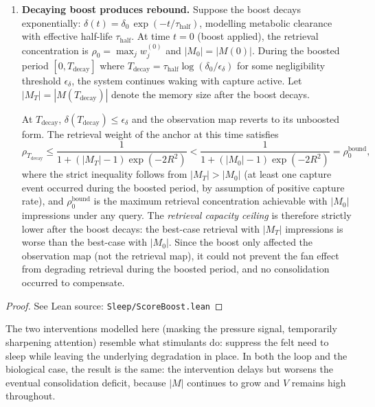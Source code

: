 \begin{theorem}
\begin{enumerate}
\item \textbf{Decaying boost produces rebound.}  Suppose the boost decays exponentially: $\delta(t) = \delta_0\,\exp(-t/\tau_{\mathrm{half}})$, modelling metabolic clearance with effective half-life $\tau_{\mathrm{half}}$.  At time $t = 0$ (boost applied), the retrieval concentration is $\rho_0 = \max_j w_j^{(0)}$ and $|M_0| = |M(0)|$.  During the boosted period $[0, T_{\mathrm{decay}}]$ where $T_{\mathrm{decay}} = \tau_{\mathrm{half}}\log(\delta_0/\epsilon_\delta)$ for some negligibility threshold $\epsilon_\delta$, the system continues waking with capture active.  Let $|M_{T}| = |M(T_{\mathrm{decay}})|$ denote the memory size after the boost decays.

At $T_{\mathrm{decay}}$, $\delta(T_{\mathrm{decay}}) \leq \epsilon_\delta$ and the observation map reverts to its unboosted form.  The retrieval weight of the anchor at this time satisfies
\[
\rho_{T_{\mathrm{decay}}} \leq \frac{1}{1 + (|M_{T}| - 1)\exp(-2R^2)} < \frac{1}{1 + (|M_0| - 1)\exp(-2R^2)} = \rho_0^{\mathrm{bound}},
\]
where the strict inequality follows from $|M_T| > |M_0|$ (at least one capture event occurred during the boosted period, by assumption of positive capture rate), and $\rho_0^{\mathrm{bound}}$ is the maximum retrieval concentration achievable with $|M_0|$ impressions under any query.  The \emph{retrieval capacity ceiling} is therefore strictly lower after the boost decays: the best-case retrieval with $|M_T|$ impressions is worse than the best-case with $|M_0|$.  Since the boost only affected the observation map (not the retrieval map), it could not prevent the fan effect from degrading retrieval during the boosted period, and no consolidation occurred to compensate.
\end{enumerate}
\end{theorem}

\begin{proof}
\leanok
{}
See Lean source: \texttt{Sleep/ScoreBoost.lean}
\end{proof}

\begin{remark}
\label{rem:caffeine}
\leanok
{}
The two interventions modelled here (masking the pressure signal, temporarily sharpening attention) resemble what stimulants do: suppress the felt need to sleep while leaving the underlying degradation in place.  In both the loop and the biological case, the result is the same: the intervention delays but worsens the eventual consolidation deficit, because $|M|$ continues to grow and $V$ remains high throughout.
\end{remark}

